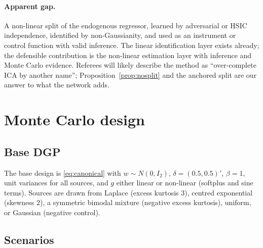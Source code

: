 \documentclass[11pt]{article}
\theoremstyle{definition}
\theoremstyle{remark}
\begin{document}
\paragraph{Apparent gap.} A non-linear split of the endogenous regressor, learned by adversarial or
HSIC independence, identified by non-Gaussianity, and used as an instrument or control function
with valid inference. The linear identification layer exists already; the defensible contribution
is the non-linear estimation layer with inference and Monte Carlo evidence. Referees will likely
describe the method as ``over-complete ICA by another name''; Proposition~\ref{prop:nosplit} and the
anchored split are our answer to what the network adds.

\section{Monte Carlo design}\label{sec:mc}

\subsection{Base DGP}

The base design is \eqref{eq:canonical} with $w\sim N(0,I_2)$, $\delta = (0.5,0.5)'$, $\beta=1$, unit
variances for all sources, and $g$ either linear or non-linear (softplus and sine terms). Sources are
drawn from Laplace (excess kurtosis $3$), centred exponential (skewness $2$), a symmetric bimodal
mixture (negative excess kurtosis), uniform, or Gaussian (negative control).

\subsection{Scenarios}
\end{document}
